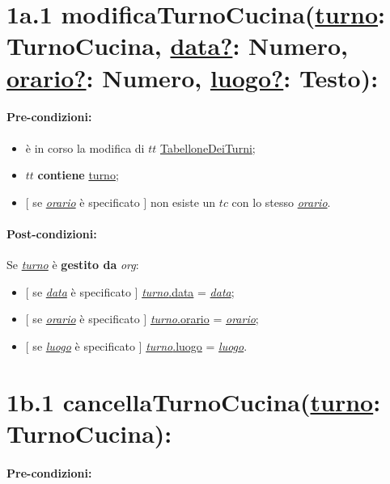 \section*{1a.1 modificaTurnoCucina(\underline{turno}: TurnoCucina, \underline{data?}: Numero, \underline{orario?}: Numero, \underline{luogo?}: Testo):}

\paragraph{Pre-condizioni:}

\begin{itemize}
 \item è in corso la modifica di $tt$ \underline{TabelloneDeiTurni};
 \item $tt$ \textbf{contiene} \underline{turno};
 \item $[$ se \underline{\textit{orario}} è specificato $]$ non esiste un $tc$ con lo stesso \underline{\textit{orario}}.
\end{itemize}

\paragraph{Post-condizioni:} Se \underline{\textit{turno}} è \textbf{gestito da} \textit{org}:

\begin{itemize}
    \item $[$ se \underline{\textit{data}} è specificato $]$ \underline{\textit{turno}.data} = \underline{\textit{data}};

    \item $[$ se \underline{\textit{orario}} è specificato $]$ \underline{\textit{turno}.orario} = \underline{\textit{orario}};

    \item $[$ se \underline{\textit{luogo}} è specificato $]$ \underline{\textit{turno}.luogo} = \underline{\textit{luogo}}.

\end{itemize}

\section*{1b.1 cancellaTurnoCucina(\underline{turno}: TurnoCucina):}

\paragraph{Pre-condizioni:}


